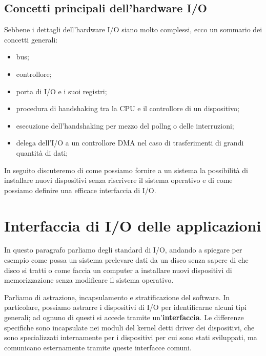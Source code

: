     \subsection{Concetti principali dell'hardware I/O}
        Sebbene i dettagli dell'hardware I/O siano molto complessi, ecco un sommario dei concetti generali:
        \begin{itemize}
            \item bus;
            
            \item controllore;
            
            \item porta di I/O e i suoi registri;
            
            \item procedura di handshaking tra la CPU e il controllore di un dispositivo;
            
            \item esecuzione dell'handshaking per mezzo del pollng o delle interruzioni;
            
            \item delega dell'I/O a un controllore DMA nel caso di trasferimenti di grandi quantità di dati;
        \end{itemize}
        
        In seguito discuteremo di come possiamo fornire a un sistema la possibilità di installare nuovi dispositivi senza riscrivere il sistema operativo e di come possiamo definire una efficace interfaccia di I/O.
        
\section{Interfaccia di I/O delle applicazioni}
    In questo paragrafo parliamo degli standard di I/O, andando a spiegare per esempio come possa un sistema prelevare dati da un disco senza sapere di che disco si tratti o come faccia un computer a installare nuovi dispositivi di memorizzazione senza modificare il sistema operativo.
    
    Parliamo di astrazione, incapsulamento e stratificazione del software. In particolare, possiamo astrarre i dispositivi di I/O per identificarne alcuni tipi generali; ad ognuno di questi si accede tramite un'\textbf{interfaccia}. Le differenze specifiche sono incapsulate nei moduli del kernel detti driver dei dispositivi, che sono specializzati internamente per i dispositivi per cui sono stati sviluppati, ma comunicano esternamente tramite queste interfacce comuni.
    
